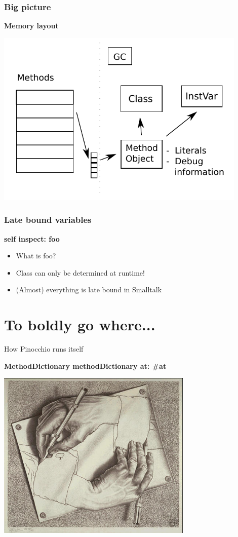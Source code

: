 \documentclass{beamer}
\begin{document}
\begin{frame}[fragile]
    \frametitle{Big picture}
    {\bf Memory layout }
    \begin{center}\includegraphics[width=0.9\textwidth]{memory.pdf}\end{center}
\end{frame}

\begin{frame}[fragile]
    \frametitle{Late bound variables}
    {\bf self inspect: foo }
    \begin{itemize}
        \item What is foo?
        \item Class can only be determined at runtime! 
        \item (Almost) everything is late bound in Smalltalk
    \end{itemize}
\end{frame}

\section{To boldly go where...}

\begin{frame}{How Pinocchio runs itself}

    {\bf MethodDictionary methodDictionary at: \#at}

    \begin{center}\includegraphics[width=0.7\textwidth]{escher.jpg}\end{center}
\end{frame}
\end{document}
